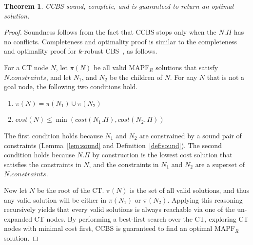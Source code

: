 \documentclass[review]{elsarticle}
\newtheorem{theorem}{Theorem}
\newcommand{\cost}{\textit{cost}}
\newcommand\konstantin[1]{\nb{\textbf{Konstantin:}}{red}{#1}}
\newcommand\roni[1]{\nb{\textbf{Roni:}}{green}{#1}}
\newcommand\dor[1]{\nb{\textbf{Dor:}}{Fuchsia}{#1}}
\newcommand{\ccbs}{\ac{CCBS}\xspace}
\newcommand{\cbs}{\ac{CBS}\xspace}
\newcommand{\mapfr}{\ac{MAPF}$_R$\xspace}
\newcommand{\shortcite}{\cite}
\begin{document}
\begin{theorem}
\ccbs sound, complete, and is guaranteed to return an optimal solution. 
\label{the:optimal}
\end{theorem}
\begin{proof}
Soundness follows from the fact that \ccbs stops only when the $N.\Pi$ has no conflicts. 
Completeness and optimality proof is similar to the completeness and optimality proof for $k$-robust \cbs~\shortcite{atzmon2018robust}, as follows. 

For a CT node $N$, let $\pi(N)$ be all valid \mapfr{} solutions that satisfy $N.constraints$, and let $N_1$, and $N_2$ be the children of $N$. For any $N$ that is not a goal node, the following two conditions hold.
\begin{enumerate}
    \item $\pi(N)=\pi(N_1)\cup\pi(N_2)$
    \item $\cost(N)\leq \min(\cost(N_1.\Pi), \cost(N_2,\Pi))$
\end{enumerate}
The first condition holds because $N_1$ and $N_2$ are constrained by a sound pair of constraints (Lemma~\ref{lem:sound} and Definition~\ref{def:sound}). 
The second condition holds because $N.\Pi$ by construction is the lowest cost solution that satisfies the constraints in $N$, and the constraints in $N_1$ and $N_2$ are a superset of $N.constraints$. 


Now let $N$ be the root of the CT. 
$\pi(N)$ is the set of all valid solutions, 
and thus any valid solution will be either in $\pi(N_1)$ or $\pi(N_2)$. Applying this reasoning recursively yields that every valid solutions is always reachable via one of the un-expanded CT nodes. 
By performing a best-first search over the CT, exploring CT nodes with minimal cost first, \ccbs{} is guaranteed to find an optimal  \mapfr{} solution. 
\end{proof}

\end{document}
